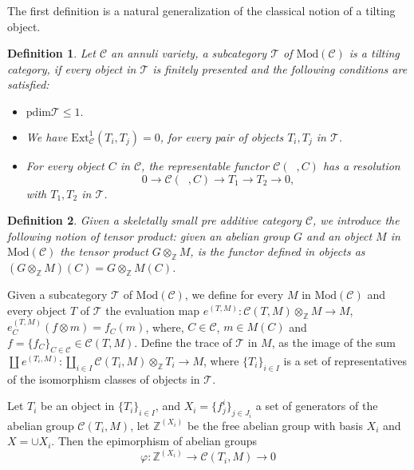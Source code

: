 \documentclass{amsart}
\theoremstyle{plain}
\newtheorem{definition}{Definition}
\numberwithin{equation}{section}
\begin{document}
The first definition is a natural generalization of the classical notion of
a tilting object.

\begin{definition}
Let $\mathcal{C}$ an annuli variety, a subcategory $\mathcal{T}$ of $\mathrm{\mathrm{Mod}}(\mathcal{C})$ is a tilting category, if every object in $\mathcal{T}$ is finitely presented and the following conditions are
satisfied:

\begin{itemize}
\item[(i)] $\mathrm{pdim}\mathcal{T}\leq 1.$

\item[(ii)] We have $\mathrm{Ext}_{\mathcal{C}}^{1}(T_{i},T_{j})=0$, for
every pair of objects $T_{i},T_{j}$ in $\mathcal{T}$.

\item[(iii)] For every object $C$ in $\mathcal{C}$, the representable
functor $\mathcal{C}(\;\;,C)$ has a resolution
\begin{equation*}
0\rightarrow \mathcal{C}(\;\;,C)\rightarrow T_{1}\rightarrow
T_{2}\rightarrow 0\text{,}
\end{equation*}with $T_{1},T_{2}$ in $\mathcal{T}$.
\end{itemize}
\end{definition}

\begin{definition}
Given a skeletally small pre additive category $\mathcal{C}$, we introduce
the following notion of tensor product: given an abelian group $G$ and an
object $M$ in $\mathrm{Mod}(\mathcal{C})$ the tensor product $G\otimes _{\mathbb{Z}}M$, is the functor defined in objects as $(G\otimes _{\mathbb{Z}}M)(C)=G\otimes _{\mathbb{Z}}M(C)$.
\end{definition}

Given a subcategory $\mathcal{T}$ of $\mathrm{Mod}(\mathcal{C} )$, we define
for every $M$ in $\mathrm{Mod}(\mathcal{C})$ and every object $T$ of $\mathcal{T}$ the evaluation map $e^{(T,M)}:\mathcal{C}(T,M)\otimes _{\mathbb{Z}}M\rightarrow M$, $e^{(T,M)}_{C}(f\otimes m)=f_C(m)$, where, $C\in
\mathcal{C}$, $m\in M(C)$ and $f=\{f_{C}\}_{C\in\mathcal{C}}\in \mathcal{C}(T,M)$. Define the trace of $\mathcal{T}$ in $M$, as the image of the sum $\coprod e^{(T_{i},M)}:\coprod_{i\in I}\mathcal{C}(T_{i},M)\otimes _{\mathbb{Z}}T_{i}\rightarrow M$, where $\{T_{i}\}_{i\in I}$ is a set of
representatives of the isomorphism classes of objects in $\mathcal{T}$.

Let $T_{i}$ be an object in $\{T_{i}\}_{i\in I}$, and $X_{i}=\{f_{j}^{i}\}_{j\in J_{i}}$ a set of generators of the abelian group $\mathcal{C}(T_{i},M)$, let $\mathbb{Z}^{(X_{i})}$ be the free abelian group with basis $X_{i}$ and $X=\cup X_{i}$. Then the epimorphism of abelian groups
\begin{equation*}
\varphi :\mathbb{Z}^{(X_{i})}\rightarrow \mathcal{C}(T_{i},M)\rightarrow 0
\end{equation*}
\end{document}
